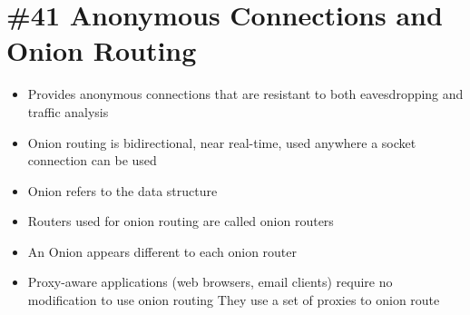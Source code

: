 \section{\#41 Anonymous Connections and Onion Routing}
\begin{itemize}
	\item Provides anonymous connections that are resistant to both eavesdropping and traffic analysis
	\item Onion routing is bidirectional, near real-time, used anywhere a socket connection can be used
	\item Onion refers to the data structure
	\item Routers used for onion routing are called onion routers
	\item An Onion appears different to each onion router
	\item Proxy-aware applications (web browsers, email clients) require no modification to use onion routing
	\subitem They use a set of proxies to onion route
\end{itemize}